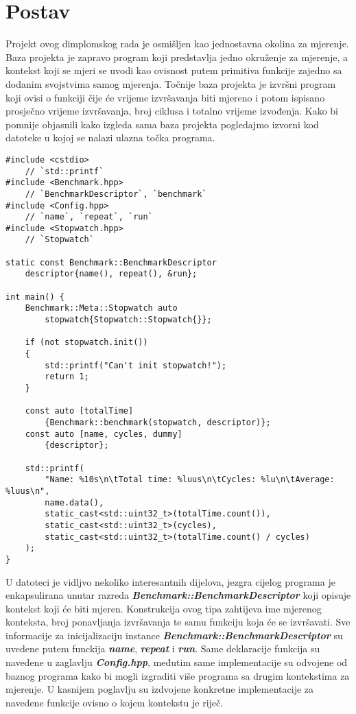 \section{Postav}
Projekt ovog dimplomskog rada je osmišljen kao jednostavna okolina za mjerenje. Baza projekta je zapravo program koji predstavlja jedno okruženje za mjerenje, a kontekst koji se mjeri se uvodi kao ovisnost putem primitiva funkcije zajedno sa dodanim svojstvima samog mjerenja. Točnije baza projekta je izvršni program koji ovisi o funkciji čije će vrijeme izvršavanja biti mjereno i potom ispisano prosječno vrijeme izvršavanja, broj ciklusa i totalno vrijeme izvođenja. Kako bi pomnije objasnili kako izgleda sama baza projekta pogledajmo izvorni kod datoteke u kojoj se nalazi ulazna točka programa.
\lstset{language=C++, tabsize=2, frame=single, breaklines=true, showstringspaces=false}
\begin{lstlisting}
#include <cstdio>
    // `std::printf`
#include <Benchmark.hpp>
    // `BenchmarkDescriptor`, `benchmark`
#include <Config.hpp> 
    // `name`, `repeat`, `run`
#include <Stopwatch.hpp>
    // `Stopwatch`

static const Benchmark::BenchmarkDescriptor 
    descriptor{name(), repeat(), &run};

int main() {
    Benchmark::Meta::Stopwatch auto 
        stopwatch{Stopwatch::Stopwatch{}};

    if (not stopwatch.init()) 
    {
        std::printf("Can't init stopwatch!");
        return 1;
    }

    const auto [totalTime]
        {Benchmark::benchmark(stopwatch, descriptor)};
    const auto [name, cycles, dummy]
        {descriptor};

    std::printf(
        "Name: %10s\n\tTotal time: %luus\n\tCycles: %lu\n\tAverage: %luus\n",
        name.data(), 
        static_cast<std::uint32_t>(totalTime.count()),
        static_cast<std::uint32_t>(cycles),
        static_cast<std::uint32_t>(totalTime.count() / cycles)
    );
}
\end{lstlisting}
U datoteci je vidljvo nekoliko interesantnih dijelova, jezgra cijelog programa je enkapsulirana unutar razreda \textbf{\textit{Benchmark::BenchmarkDescriptor}} koji opisuje kontekst koji će biti mjeren. Konstrukcija ovog tipa zahtijeva ime mjerenog konteksta, broj ponavljanja izvršavanja te samu funkciju koja će se izvršavati. Sve informacije za inicijalizaciju instance \textbf{\textit{Benchmark::BenchmarkDescriptor}} su uvedene putem funckija \textbf{\textit{name}}, \textbf{\textit{repeat}} i \textbf{\textit{run}}. Same deklaracije funkcija su navedene u zaglavlju \textbf{\textit{Config.hpp}}, međutim same implementacije su odvojene od baznog programa kako bi mogli izgraditi više programa sa drugim kontekstima za mjerenje. U kasnijem poglavlju su izdvojene konkretne implementacije za navedene funkcije ovisno o kojem kontekstu je riječ.\\
